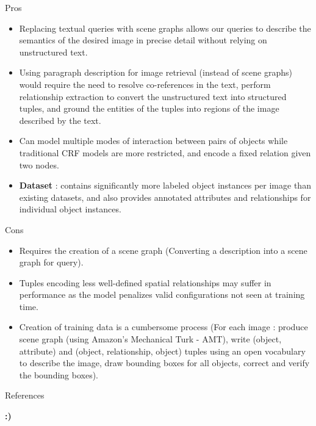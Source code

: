 \documentclass{IFES-beamer}
\begin{document}
    \begin{frame}{Pros}
        \begin{itemize}
            \item Replacing textual queries with scene graphs allows our queries to describe the semantics of the desired image in precise detail without relying on unstructured text.
            \item Using paragraph description for image retrieval (instead of scene graphs) would require the need to resolve co-references in the text, perform relationship extraction to convert the unstructured text into structured tuples, and ground the entities of the tuples into regions of the image described by the text.
            \item Can model multiple modes of interaction between pairs of objects while traditional CRF models are more restricted, and encode a fixed relation given two nodes.
            \item \textbf{Dataset} : contains significantly more labeled object instances per image than existing datasets, and also provides annotated attributes and relationships for individual object instances.
        \end{itemize}
    \end{frame}
    
    \begin{frame}{Cons}
        \begin{itemize}
            \item Requires the creation of a scene graph (Converting a description into a scene graph for query).
            \item Tuples encoding less well-defined spatial relationships may suffer in performance as the model penalizes valid configurations not seen at training time.
            \item Creation of training data is a cumbersome process (For each image : produce scene graph (using  Amazon’s Mechanical Turk - AMT), write (object, attribute) and (object, relationship, object) tuples using an open vocabulary to describe the image, draw bounding boxes for all objects, correct and verify the bounding boxes).
        \end{itemize}
    \end{frame}

    \begin{frame}{References}
        \printbibliography
    \end{frame}

    \begin{frame}{ }
        \begin{center}
            \Huge{
            \textbf{:)}}
        \end{center}
        
    \end{frame}
\end{document}
